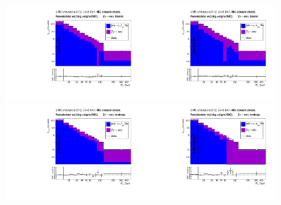 \begin{figure}[htb]
  \begin{center}
   \includegraphics[width=0.45\textwidth]{../figs/figs_v11/ELECTRON_ZGamma/PrepareYields/c_DATAvsBkgPlusSigMCc_ELECTRON_ZGamma_TEMPL_CHISO_UNblind_MCclosure__Barrel__phoEt_MCclosure.pdf}\includegraphics[width=0.45\textwidth]{../figs/figs_v11/ELECTRON_ZGamma/PrepareYields/c_DATAvsBkgPlusSigMCc_ELECTRON_ZGamma_TEMPL_SIHIH_UNblind_MCclosure__Barrel__phoEt_MCclosure.pdf}  \\
   \includegraphics[width=0.45\textwidth]{../figs/figs_v11/ELECTRON_ZGamma/PrepareYields/c_DATAvsBkgPlusSigMCc_ELECTRON_ZGamma_TEMPL_CHISO_UNblind_MCclosure__Endcap__phoEt_MCclosure.pdf}\includegraphics[width=0.45\textwidth]{../figs/figs_v11/ELECTRON_ZGamma/PrepareYields/c_DATAvsBkgPlusSigMCc_ELECTRON_ZGamma_TEMPL_SIHIH_UNblind_MCclosure__Endcap__phoEt_MCclosure.pdf}  \\

\end{center}
\end{figure}
